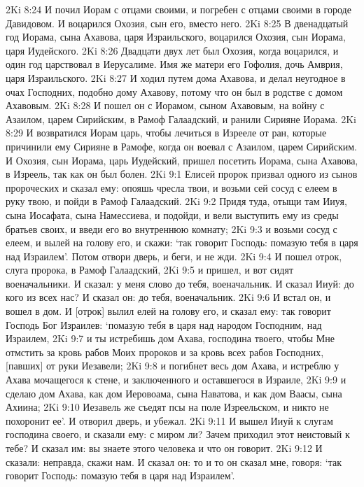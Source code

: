 2Ki 8:24  И почил Иорам с отцами своими, и погребен с отцами своими в городе Давидовом. И воцарился Охозия, сын его, вместо него.
2Ki 8:25  В двенадцатый год Иорама, сына Ахавова, царя Израильского, воцарился Охозия, сын Иорама, царя Иудейского.
2Ki 8:26  Двадцати двух лет был Охозия, когда воцарился, и один год царствовал в Иерусалиме. Имя же матери его Гофолия, дочь Амврия, царя Израильского.
2Ki 8:27  И ходил путем дома Ахавова, и делал неугодное в очах Господних, подобно дому Ахавову, потому что он был в родстве с домом Ахавовым.
2Ki 8:28  И пошел он с Иорамом, сыном Ахавовым, на войну с Азаилом, царем Сирийским, в Рамоф Галаадский, и ранили Сирияне Иорама.
2Ki 8:29  И возвратился Иорам царь, чтобы лечиться в Изрееле от ран, которые причинили ему Сирияне в Рамофе, когда он воевал с Азаилом, царем Сирийским. И Охозия, сын Иорама, царь Иудейский, пришел посетить Иорама, сына Ахавова, в Изреель, так как он был болен.
2Ki 9:1  Елисей пророк призвал одного из сынов пророческих и сказал ему: опояшь чресла твои, и возьми сей сосуд с елеем в руку твою, и пойди в Рамоф Галаадский.
2Ki 9:2  Придя туда, отыщи там Ииуя, сына Иосафата, сына Намессиева, и подойди, и вели выступить ему из среды братьев своих, и введи его во внутреннюю комнату;
2Ki 9:3  и возьми сосуд с елеем, и вылей на голову его, и скажи: `так говорит Господь: помазую тебя в царя над Израилем'. Потом отвори дверь, и беги, и не жди.
2Ki 9:4  И пошел отрок, слуга пророка, в Рамоф Галаадский,
2Ki 9:5  и пришел, и вот сидят военачальники. И сказал: у меня слово до тебя, военачальник. И сказал Ииуй: до кого из всех нас? И сказал он: до тебя, военачальник.
2Ki 9:6  И встал он, и вошел в дом. И [отрок] вылил елей на голову его, и сказал ему: так говорит Господь Бог Израилев: `помазую тебя в царя над народом Господним, над Израилем,
2Ki 9:7  и ты истребишь дом Ахава, господина твоего, чтобы Мне отмстить за кровь рабов Моих пророков и за кровь всех рабов Господних, [павших] от руки Иезавели;
2Ki 9:8  и погибнет весь дом Ахава, и истреблю у Ахава мочащегося к стене, и заключенного и оставшегося в Израиле,
2Ki 9:9  и сделаю дом Ахава, как дом Иеровоама, сына Наватова, и как дом Ваасы, сына Ахиина;
2Ki 9:10  Иезавель же съедят псы на поле Изреельском, и никто не похоронит ее'. И отворил дверь, и убежал.
2Ki 9:11  И вышел Ииуй к слугам господина своего, и сказали ему: с миром ли? Зачем приходил этот неистовый к тебе? И сказал им: вы знаете этого человека и что он говорит.
2Ki 9:12  И сказали: неправда, скажи нам. И сказал он: то и то он сказал мне, говоря: `так говорит Господь: помазую тебя в царя над Израилем'.
